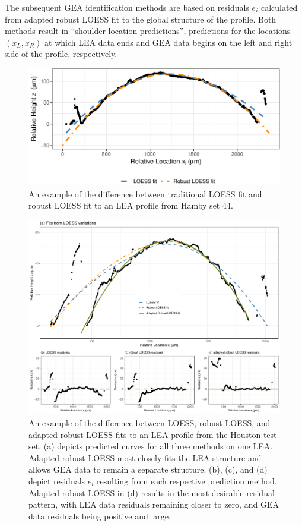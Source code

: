\documentclass[12pt]{article}
\begin{document}
The subsequent GEA identification methods are based on residuals \(e_i\)
calculated from adapted robust LOESS fit to the global structure of the
profile. Both methods result in ``shoulder location predictions'',
predictions for the locations \((x_L, x_R)\) at which LEA data ends and
GEA data begins on the left and right side of the profile, respectively.

\begin{figure}
\centering
\includegraphics{writeup_files/figure-latex/loess-vs-locfit-1.pdf}
\caption{\label{loess-vs-locfit}An example of the difference between
traditional LOESS fit and robust LOESS fit to an LEA profile from Hamby
set 44.}
\end{figure}

\begin{figure}
\centering
\includegraphics[width=\textwidth]{../images/loess_comparison_plot_all_wide}
\caption{An example of the difference between LOESS, robust LOESS, and adapted robust LOESS fits to an LEA profile from the Houston-test set. (a) depicts predicted curves for all three methods on one LEA. Adapted robust LOESS most closely fits the LEA structure and allows GEA data to remain a separate structure. (b), (c), and (d) depict residuals $e_i$ resulting from each respective prediction method. Adapted robust LOESS in (d) results in the most desirable residual pattern, with LEA data residuals remaining closer to zero, and GEA data residuals being positive and large.}
\label{houston-adapted-rlo-pdf}
\end{figure}
\end{document}
